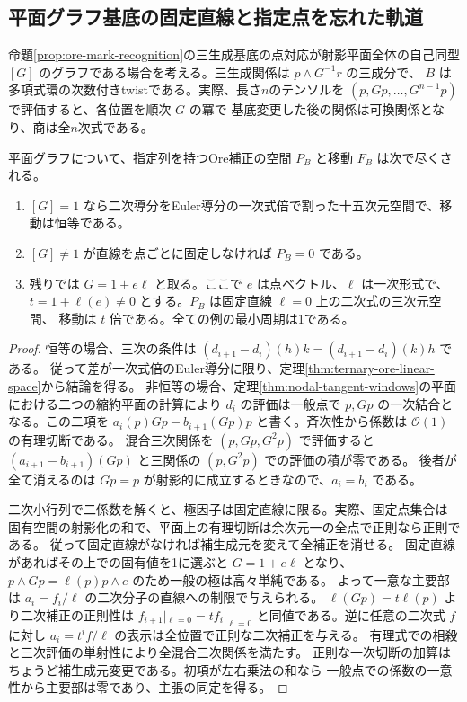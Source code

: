 \subsection{平面グラフ基底の固定直線と指定点を忘れた軌道}
\label{sec:plane-graph-ore-windows}
命題\ref{prop:ore-mark-recognition}の三生成基底の点対応が射影平面全体の自己同型
$[G]$ のグラフである場合を考える。三生成関係は $p\wedge G^{-1}r$ の三成分で、
$B$ は多項式環の次数付きtwistである。実際、長さ$n$のテンソルを
$(p,Gp,\ldots,G^{n-1}p)$ で評価すると、各位置を順次 $G$ の冪で
基底変更した後の関係は可換関係となり、商は全$n$次式である。

\begin{theorem}\label{thm:plane-ore-fixed-lines}
平面グラフについて、指定列を持つOre補正の空間 $P_B$ と移動 $F_B$ は次で尽くされる。
\begin{enumerate}
\item $[G]=1$ なら二次導分をEuler導分の一次式倍で割った十五次元空間で、移動は恒等である。
\item $[G]\ne1$ が直線を点ごとに固定しなければ $P_B=0$ である。
\item 残りでは $G=1+e\ell$ と取る。ここで $e$ は点ベクトル、$\ell$ は一次形式で、
$t=1+\ell(e)\ne0$ とする。$P_B$ は固定直線 $\ell=0$ 上の二次式の三次元空間、
移動は $t$ 倍である。全ての例の最小周期は1である。
\end{enumerate}
\end{theorem}
\begin{proof}
恒等の場合、三次の条件は $(d_{i+1}-d_i)(h)k=(d_{i+1}-d_i)(k)h$ である。
従って差が一次式倍のEuler導分に限り、定理\ref{thm:ternary-ore-linear-space}から結論を得る。
非恒等の場合、定理\ref{thm:nodal-tangent-windows}の平面における二つの縮約平面の計算により
$d_i$ の評価は一般点で $p,Gp$ の一次結合となる。この二項を
$a_i(p)Gp-b_{i+1}(Gp)p$ と書く。斉次性から係数は $\mathcal O(1)$ の有理切断である。
混合三次関係を $(p,Gp,G^2p)$ で評価すると
$(a_{i+1}-b_{i+1})(Gp)$ と三関係の $(p,G^2p)$ での評価の積が零である。
後者が全て消えるのは $Gp=p$ が射影的に成立するときなので、$a_i=b_i$ である。

二次小行列で二係数を解くと、極因子は固定直線に限る。実際、固定点集合は
固有空間の射影化の和で、平面上の有理切断は余次元一の全点で正則なら正則である。
従って固定直線がなければ補生成元を変えて全補正を消せる。
固定直線があればその上での固有値を1に選ぶと $G=1+e\ell$ となり、
$p\wedge Gp=\ell(p)p\wedge e$ のため一般の極は高々単純である。
よって一意な主要部は $a_i=f_i/\ell$ の二次分子の直線への制限で与えられる。
$\ell(Gp)=t\ell(p)$ より二次補正の正則性は
$f_{i+1}|_{\ell=0}=t f_i|_{\ell=0}$ と同値である。逆に任意の二次式 $f$ に対し
$a_i=t^i f/\ell$ の表示は全位置で正則な二次補正を与える。
有理式での相殺と三次評価の単射性により全混合三次関係を満たす。
正則な一次切断の加算はちょうど補生成元変更である。初項が左右乗法の和なら
一般点での係数の一意性から主要部は零であり、主張の同定を得る。
\end{proof}

